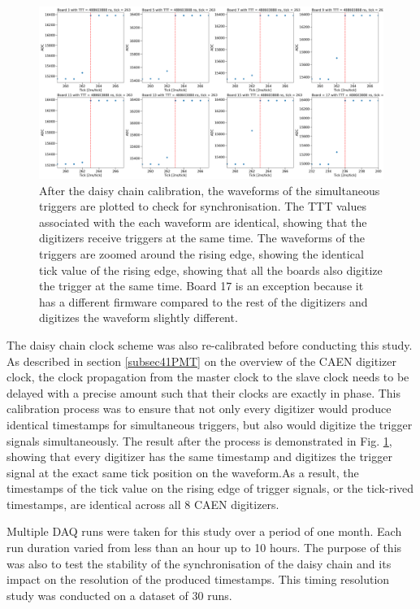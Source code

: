 \begin{figure}[htbp!] 
\centering    
\includegraphics[width=1.0\textwidth]{daisychain_calib}
\caption[daisychainCALIB]{
After the daisy chain calibration, the waveforms of the simultaneous triggers are plotted to check for synchronisation.
The TTT values associated with the each waveform are identical, showing that the digitizers receive triggers at the same time.
The waveforms of the triggers are zoomed around the rising edge, showing the identical tick value of the rising edge, showing that all the boards also digitize the trigger at the same time.
Board 17 is an exception because it has a different firmware compared to the rest of the digitizers and digitizes the waveform slightly different.
}
\label{fig:daisychainCALIB}
\end{figure}

The daisy chain clock scheme was also re-calibrated before conducting this study.
As described in section \ref{subsec41PMT} on the overview of the CAEN digitizer clock, the clock propagation from the master clock to the slave clock needs to be delayed with a precise amount such that their clocks are exactly in phase.
This calibration process was to ensure that not only every digitizer would produce identical timestamps for simultaneous triggers, but also would digitize the trigger signals simultaneously.
The result after the process is demonstrated in Fig. \ref{fig:daisychainCALIB}, showing that every digitizer has the same timestamp and digitizes the trigger signal at the exact same tick position on the waveform.As a result, the timestamps of the tick value on the rising edge of trigger signals, or the tick-rived timestamps, are identical across all 8 CAEN digitizers.

Multiple DAQ runs were taken for this study over a period of one month.
Each run duration varied from less than an hour up to 10 hours.
The purpose of this was also to test the stability of the synchronisation of the daisy chain and its impact on the resolution of the produced timestamps.
This timing resolution study was conducted on a dataset of 30 runs.

